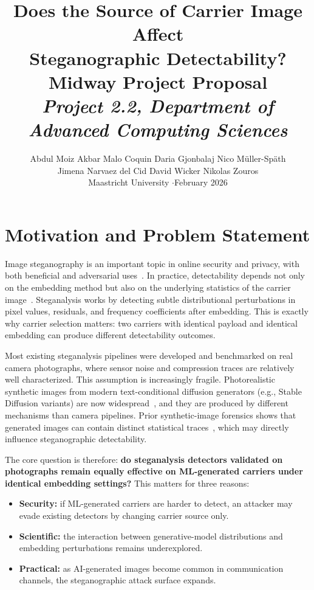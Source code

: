 \documentclass[10pt,twocolumn,a4paper]{article}
\title{\vspace{-1.2cm}\textbf{Does the Source of Carrier Image Affect\\
Steganographic Detectability?}\\[4pt]
\large Midway Project Proposal\\[6pt]
\normalsize\textit{Project 2.2, Department of Advanced Computing Sciences}}
\author{Abdul Moiz Akbar \quad Malo Coquin \quad Daria Gjonbalaj \quad Nico Müller-Späth\\[2pt]
Jimena Narvaez del Cid \quad David Wicker \quad Nikolas Zouros\\[2pt]
\small Maastricht University \quad$\cdot$\quad February 2026}
\date{}
\begin{document}
\maketitle
\thispagestyle{fancy}
\vspace{-0.6cm}

\section{Motivation and Problem Statement}

Image steganography is an important topic in online security and privacy, with both beneficial and adversarial uses~\cite{petitcolas1999,cheddad2010,provos2003f5}. In practice, detectability depends not only on the embedding method but also on the underlying statistics of the carrier image~\cite{hussain2018,fridrich2012srm}. Steganalysis works by detecting subtle distributional perturbations in pixel values, residuals, and frequency coefficients after embedding. This is exactly why carrier selection matters: two carriers with identical payload and identical embedding can produce different detectability outcomes.

Most existing steganalysis pipelines were developed and benchmarked on real camera photographs, where sensor noise and compression traces are relatively well characterized. This assumption is increasingly fragile. Photorealistic synthetic images from modern text-conditional diffusion generators (e.g., Stable Diffusion variants) are now widespread~\cite{rombach2022sd}, and they are produced by different mechanisms than camera pipelines. Prior synthetic-image forensics shows that generated images can contain distinct statistical traces~\cite{wang2020cnn,corvi2023diffusion}, which may directly influence steganographic detectability.

The core question is therefore: \textbf{do steganalysis detectors validated on photographs remain equally effective on ML-generated carriers under identical embedding settings?} This matters for three reasons:
\begin{itemize}
\item \textbf{Security:} if ML-generated carriers are harder to detect, an attacker may evade existing detectors by changing carrier source only.
\item \textbf{Scientific:} the interaction between generative-model distributions and embedding perturbations remains underexplored.
\item \textbf{Practical:} as AI-generated images become common in communication channels, the steganographic attack surface expands.
\end{itemize}
\end{document}
